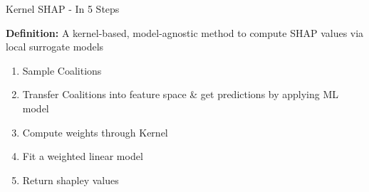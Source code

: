 \documentclass[11pt,compress,t,notes=noshow, aspectratio=169, xcolor=table]{beamer}
\begin{document}
\begin{vbframe}{Kernel SHAP - In 5 Steps}

\textbf{Definition:} A kernel-based, model-agnostic method to compute SHAP values via local surrogate models\\
\vspace{1cm}
\begin{enumerate}
    \item Sample Coalitions 
    
    \item Transfer Coalitions into feature space \& get predictions by applying ML model
    
    
    \item Compute weights through Kernel
    
    \item Fit a weighted linear model 

    \item Return shapley values
    
    
\end{enumerate}

\end{vbframe}
\end{document}
